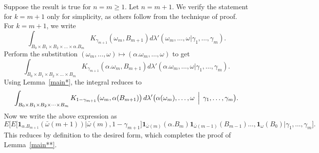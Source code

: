 \documentclass[final]{aomart}
\def\mathbb#1{#1}%
\theoremstyle{plain}
\theoremstyle{definition}
\theoremstyle{remark}
\begin{document}
Suppose the result is true for $n=m\geq1$. Let $n=m+1$. We verify the statement for $k=m+1$ only for simplicity, as others follow from the technique of proof. For $k=m+1$, we write \[
\int_{B_0 \times B_1 \times B_2 \times \dots \times \alpha.B_{m}} K_{\gamma_{m+1}}(\omega_m, B_{m+1}) d \lambda'( \omega_m,\dots, \omega| \gamma_1,\dots, \gamma_m) .
\]  
Perform the substitution $ (\omega_m,\dots, \omega) \mapsto (\alpha. \omega_m,\dots, \omega)$ to get \[
\int_{B_0 \times B_1 \times B_2 \times \dots \times B_{m}} K_{ \gamma_{m+1}}(\alpha.\omega_m, B_{m+1}) d \lambda'( \alpha.\omega_m,\dots, \omega| \gamma_1,\dots, \gamma_m) .
\]
Using Lemma~\ref{main*}, the integral reduces to 
\begin{align}
\int_{B_0\times B_1 \times B_2 \times \cdots \times B_m}
K_{1-\gamma_{m+1}}\bigl(\omega_m, \alpha(B_{m+1})\bigr)\,
d\lambda'\bigl(
    \alpha(\omega_m),\ldots,\omega
    \,\Bigm|\,
    \gamma_1,\ldots,\gamma_m
\bigr) \nonumber.
\end{align}
Now we write the above expression as \[
\mathbb{E}\Big[\mathbb{E}\Big[\boldsymbol{1}_{\alpha. B_{m+1}}(\bar{\omega}(m+1))\Big| \bar{\omega}(m),1-\gamma_{m+1}\Big] \boldsymbol{1}_{\bar{\omega}(m)}(\alpha.B_m)\boldsymbol{1}_{\bar{\omega}(m-1)}(B_{m-1})\dots, \boldsymbol{1}_{\omega}(B_{0}) \Big| \gamma_1,\dots, \gamma_m \Big].
\]
This reduces by definition to the desired form, which completes the proof of Lemma~\ref{main**}. 




\end{document}
